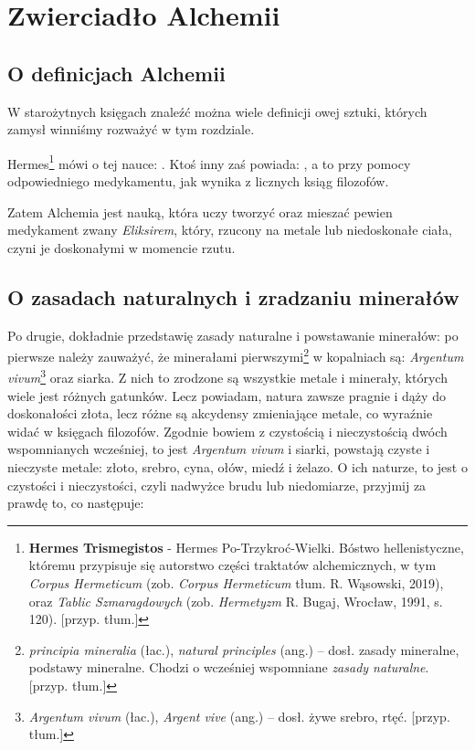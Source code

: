 
\chapter{Zwierciadło Alchemii}

\section{O definicjach Alchemii}

W starożytnych księgach znaleźć można wiele definicji owej sztuki, których zamysł winniśmy rozważyć w tym rozdziale. 

Hermes\footnote{\textbf{Hermes Trismegistos} - Hermes Po-Trzykroć-Wielki. Bóstwo hellenistyczne, któremu przypisuje się autorstwo części traktatów alchemicznych, w tym \textit{Corpus Hermeticum} (zob. \textit{Corpus Hermeticum} tłum. R. Wąsowski, 2019), oraz \textit{Tablic Szmaragdowych} (zob. \textit{Hermetyzm} R. Bugaj, Wrocław, 1991, s. 120). [przyp. tłum.]} mówi o tej nauce: .  Ktoś inny zaś powiada: , a to przy pomocy odpowiedniego medykamentu, jak wynika z licznych ksiąg filozofów.

Zatem Alchemia jest nauką, która uczy tworzyć oraz mieszać pewien medykament zwany \textit{Eliksirem}, który, rzucony na metale lub niedoskonałe ciała, czyni je doskonałymi w momencie rzutu.


\section{O zasadach naturalnych i zradzaniu minerałów}

Po drugie, dokładnie przedstawię zasady naturalne i powstawanie minerałów:  po pierwsze należy zauważyć, że minerałami pierwszymi\footnote{\textit{principia mineralia} (łac.), \textit{natural principles} (ang.) -- dosł. zasady mineralne, podstawy mineralne. Chodzi o wcześniej wspomniane \textit{zasady naturalne}. [przyp. tłum.] } w kopalniach są: \textit{Argentum vivum}\footnote{\textit{Argentum vivum} (łac.), \textit{Argent vive} (ang.) -- dosł. żywe srebro, rtęć. [przyp. tłum.]} oraz siarka. Z nich to zrodzone są wszystkie metale i minerały, których wiele jest różnych gatunków. Lecz powiadam, natura zawsze pragnie i dąży do doskonałości złota, lecz różne są akcydensy zmieniające metale, co wyraźnie widać w księgach filozofów. Zgodnie bowiem z czystością i nieczystością dwóch wspomnianych wcześniej, to jest \textit{Argentum vivum} i siarki, powstają czyste i nieczyste metale: złoto, srebro, cyna, ołów, miedź i żelazo. O ich naturze, to jest o czystości i nieczystości, czyli nadwyżce brudu lub niedomiarze, przyjmij za prawdę to, co następuje:

